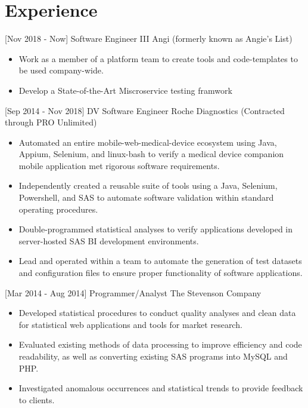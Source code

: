 \documentclass[]{moak-resume}
\begin{document}
\section{Experience}

 \begin{entrylist}
  \entry
    {[Nov 2018 - Now]}
    {Software Engineer III}
    {Angi (formerly known as Angie's List)}
    {}
\end{entrylist}
\begin{itemize}
  \setlength\itemsep{-0.4em}
  \item \small\bodyfont Work as a member of a platform team to create tools and code-templates to be used company-wide.
  \item \small\bodyfont Develop a State-of-the-Art Miscroservice testing framwork
  \newline
\end{itemize}

\begin{entrylist}
  \entry
    {[Sep 2014 - Nov 2018]}
    {DV Software Engineer}
    {Roche Diagnostics (Contracted through PRO Unlimited)}
    {}
\end{entrylist}
\begin{itemize}
  \setlength\itemsep{-0.4em}
  \item \small\bodyfont Automated an entire mobile-web-medical-device ecosystem using Java, Appium, Selenium, and linux-bash to verify a medical device companion mobile application met rigorous software requirements.
  \item \small\bodyfont Independently created a reusable suite of tools using a Java, Selenium, Powershell, and SAS to automate software validation within standard operating procedures.
  \item \small\bodyfont Double-programmed statistical analyses to verify applications developed in server-hosted SAS BI development environments. 
  \item \small\bodyfont Lead and operated within a team to automate the generation of test datasets and configuration files to ensure proper functionality of software applications.
  \newline
\end{itemize}

\begin{entrylist}
  \entry
    {[Mar 2014 - Aug 2014]}
    {Programmer/Analyst}
    {The Stevenson Company}
    {}
\end{entrylist}
\begin{itemize}
  \setlength\itemsep{-0.4em}
  \item \small\bodyfont Developed statistical procedures to conduct quality analyses and clean data for statistical web applications and tools for market research. 
  \item \small\bodyfont Evaluated existing methods of data processing to improve efficiency and code readability, as well as converting existing SAS programs into MySQL and PHP.
  \item \small\bodyfont Investigated anomalous occurrences and statistical trends to provide feedback to clients.
  \newline
\end{itemize}
\end{document}

